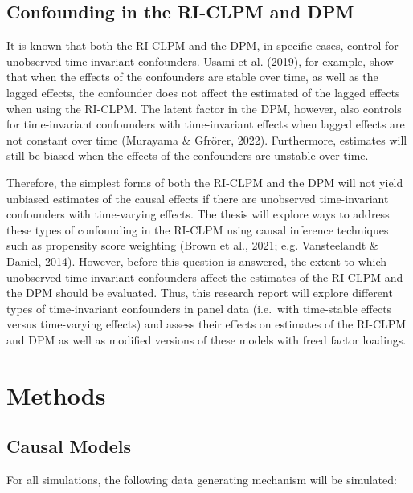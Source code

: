 \documentclass[
]{interact}
\begin{document}
\hypertarget{confounding-in-the-ri-clpm-and-dpm}{%
\subsection{Confounding in the RI-CLPM and
DPM}\label{confounding-in-the-ri-clpm-and-dpm}}

It is known that both the RI-CLPM and the DPM, in specific cases,
control for unobserved time-invariant confounders. Usami et al. (2019),
for example, show that when the effects of the confounders are stable
over time, as well as the lagged effects, the confounder does not affect
the estimated of the lagged effects when using the RI-CLPM. The latent
factor in the DPM, however, also controls for time-invariant confounders
with time-invariant effects when lagged effects are not constant over
time (Murayama \& Gfrörer, 2022). Furthermore, estimates will still be
biased when the effects of the confounders are unstable over time.

Therefore, the simplest forms of both the RI-CLPM and the DPM will not
yield unbiased estimates of the causal effects if there are unobserved
time-invariant confounders with time-varying effects. The thesis will
explore ways to address these types of confounding in the RI-CLPM using
causal inference techniques such as propensity score weighting (Brown et
al., 2021; e.g. Vansteelandt \& Daniel, 2014). However, before this
question is answered, the extent to which unobserved time-invariant
confounders affect the estimates of the RI-CLPM and the DPM should be
evaluated. Thus, this research report will explore different types of
time-invariant confounders in panel data (i.e.~with time-stable effects
versus time-varying effects) and assess their effects on estimates of
the RI-CLPM and DPM as well as modified versions of these models with
freed factor loadings.

\hypertarget{methods}{%
\section{Methods}\label{methods}}

\hypertarget{causal-models}{%
\subsection{Causal Models}\label{causal-models}}

For all simulations, the following data generating mechanism will be
simulated:
\end{document}

